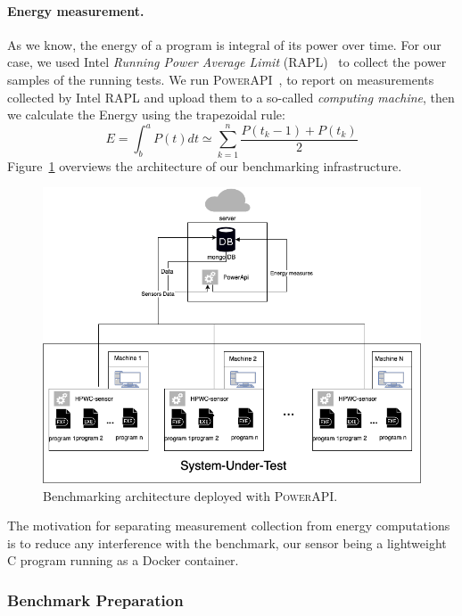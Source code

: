 \paragraph{Energy measurement.}
As we know, the energy of a program is integral of its power over time.
For our case, we used Intel \emph{Running Power Average Limit} (RAPL)~\cite{Khan:2018:RAE:3199681.3177754} to collect the power samples of the running tests.
We run \textsc{PowerAPI}~\cite{DBLP:journals/jss/ColmantRKSFS18}, to report on measurements collected by Intel RAPL and upload them to a so-called \emph{computing machine}, then we calculate the Energy using the trapezoidal rule:
\begin{equation}
      E = \int^a_b P(t)dt \simeq \sum^n_{k=1} \frac{P(t_k-1)+P(t_k)}{2}
\end{equation}
Figure~\ref{fig:powerapi} overviews the architecture of our benchmarking infrastructure.

\begin{figure}[hbt]
      \includegraphics[width=.9\linewidth]{imgs/SmartWatts.png}
      \caption{Benchmarking architecture deployed with \textsc{PowerAPI}.}
      \label{fig:powerapi}
\end{figure}

The motivation for separating measurement collection from energy computations is to reduce any interference with the benchmark, our sensor being a lightweight C program running as a Docker container.

\subsubsection{Benchmark Preparation}
